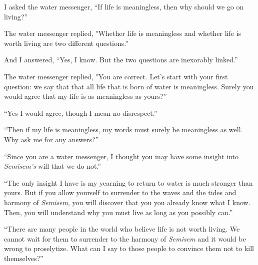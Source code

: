 \documentclass[12pt, letterpaper]{report}
\begin{document}
\vspace{1\baselineskip}
I asked the water messenger, ``If life is meaningless, then why should we go on living?''


\vspace{1\baselineskip}
The water messenger replied, "Whether life is meaningless and whether life is worth living are two different questions.''

\vspace{1\baselineskip}
And I answered, ``Yes, I know. But the two questions are inexorably linked.''

\vspace{1\baselineskip}
The water messenger replied, "You are correct. Let's start with your first question: we say that that all life that is born of water is meaningless. Surely you would agree that my life is as meaningless as yours?''

\vspace{1\baselineskip}
``Yes I would agree, though I mean no disrespect.''

\vspace{1\baselineskip}
``Then if my life is meaningless, my words must surely be meaningless as well. Why ask me for any answers?''

\vspace{1\baselineskip}
``Since you are a water messenger, I thought you may have some insight into \textit{Semisem's} will that we do not.''

\vspace{1\baselineskip}
``The only insight I have is my yearning to return to water is much stronger than yours. But if you allow yourself to surrender to the waves and the tides and harmony of \textit{Semisem}, you will discover that you you already know what I know. Then, you will understand why you must live as long as you possibly can.''

\vspace{1\baselineskip}
``There are many people in the world who believe life is not worth living. We cannot wait for them to surrender to the harmony of \textit{Semisem} and it would be wrong to proselytize. What can I say to those people to convince them not to kill themselves?''













  
  
\end{document}

